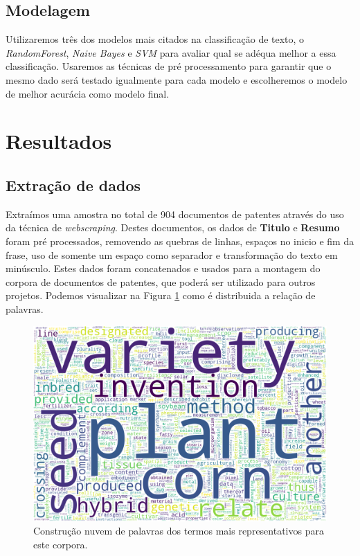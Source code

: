 \subsection{Modelagem}
Utilizaremos três dos modelos mais citados na classificação de texto, o \textit{RandomForest}, \textit{Naive Bayes} e \textit{SVM} para avaliar qual se adéqua melhor a essa classificação. Usaremos as técnicas de pré processamento para garantir que o mesmo dado será testado igualmente para cada modelo e escolheremos o modelo de melhor acurácia como modelo final.


\section{Resultados}

\subsection{Extração de dados}

Extraímos uma amostra no total de 904 documentos de patentes através do uso da técnica de \textit{webscraping}. Destes documentos, os dados de \textbf{Titulo} e \textbf{Resumo} foram pré processados, removendo as quebras de linhas, espaços no inicio e fim da frase, uso de somente um espaço como separador e transformação do texto em minúsculo. Estes dados foram concatenados e usados para a montagem do corpora de documentos de patentes, que poderá ser utilizado para outros projetos. Podemos visualizar na Figura \ref{wordcloud_pre_image} como é distribuida a relação de palavras.

\begin{figure}[ht!]
	\centering
	\includegraphics[scale=0.3]{imagens/wordcloud_preprocess.png}
	\caption{Construção nuvem de palavras dos termos mais representativos para este corpora.
			 \label{wordcloud_pre_image}}
\end{figure}

